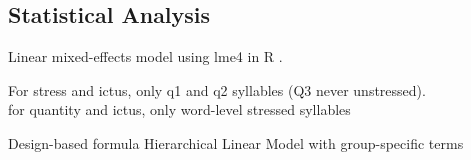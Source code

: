 \subsection{Statistical Analysis} 
Linear mixed-effects model using lme4 in R \cite{rlme4}. 

For stress and ictus, only q1 and q2 syllables (Q3 never unstressed). \\
for quantity and ictus, only word-level stressed syllables



Design-based formula
Hierarchical Linear Model with group-specific terms

\cite{goodrichRstanarmBayesianApplied2020,brillemanJointLongitudinalTimetoevent2018}
